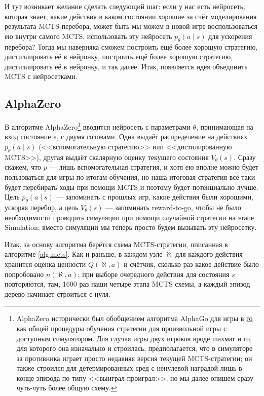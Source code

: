 И тут возникает желание сделать следующий шаг: если у нас есть нейросеть, которая знает, какие действия в каком состоянии хорошие за счёт моделирования результата MCTS-перебора, может быть мы можем в новой игре воспользоваться ею внутри самого MCTS, использовать эту нейросеть $p_{\theta}(a \mid s)$ для ускорения перебора? Тогда мы наверняка сможем построить ещё более хорошую стратегию, дистиллировать её в нейронку, построить ещё более хорошую стратегию, дистиллировать её в нейронку, и так далее. Итак, появляется идея объединить MCTS с нейросетками.

\subsection{AlphaZero}

В алгоритме AlphaZero\footnote{AlphaZero исторически был обобщением алгоритма AlphaGo для игры в \href{https://ru.wikipedia.org/wiki/Го}{го} как общей процедуры обучения стратегии для произвольной игры с доступным симулятором. Для случая игры двух игроков вроде шахмат и го, для которого она изначально и строилась, предполагается, что в симуляторе за противника играет просто недавняя версия текущей MCTS-стратегии; он также строился для детермированных сред с ненулевой наградой лишь в конце эпизода по типу <<выиграл-проиграл>>, но мы далее опишем сразу чуть-чуть более общую схему.} вводится нейросеть с параметрами $\theta$, принимающая на вход состояние $s$, с двумя головами. Одна выдаёт распределение на действиях $p_{\theta}(a \mid s)$ (<<вспомогательную стратегию>> или <<дистилированную MCTS>>), другая выдаёт скалярную оценку текущего состояния $V_\theta(s)$. Сразу скажем, что $p$ --- лишь вспомогательная стратегия, и хотя ею вполне можно будет пользоваться для игры по итогам обучения, но наша итоговая стратегия всё-таки будет перебирать ходы при помощи MCTS и поэтому будет потенциально лучше. Цель $p_{\theta}(a \mid s)$ --- запоминать с прошлых игр, какие действия были хорошими, ускоряя перебор, а цель $V_{\theta}(s)$ --- запоминать reward-to-go, чтобы не было необходимости проводить симуляции при помощи случайной стратегии на этапе Simulation; вместо симуляции мы теперь просто будем вызывать эту нейросетку.

Итак, за основу алгоритма берётся схема MCTS-стратегии, описанная в алгоритме \ref{alg:mcts}. Как и раньше, в каждом узле $\aleph$ для каждого действия хранится оценка ценности $Q(\aleph, a)$ и счётчик, сколько раз какое действие было попробовано $n(\aleph, a)$; при выборе очередного действия для состояния $s$ повторяются, там, 1600 раз наши четыре этапа MCTS схемы, а каждый эпизод дерево начинает строиться с нуля. 


